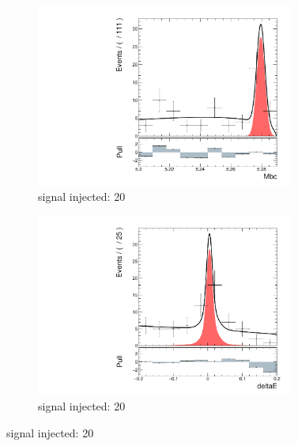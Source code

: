 \begin{figure}[htpb]
	\ContinuedFloat
	\begin{subfigure}{0.5\linewidth}
		\includegraphics[page=1,height=6cm]{figures/injection_sig_20/ds_gen_Mbc_2D.pdf}
		\caption{signal injected: 20}
	\end{subfigure}
	\begin{subfigure}{0.5\linewidth}
		\includegraphics[page=1,height=6cm]{figures/injection_sig_20/ds_gen_deltaE_2D.pdf}
		\caption{signal injected: 20}
	\end{subfigure}
	

\end{figure}
